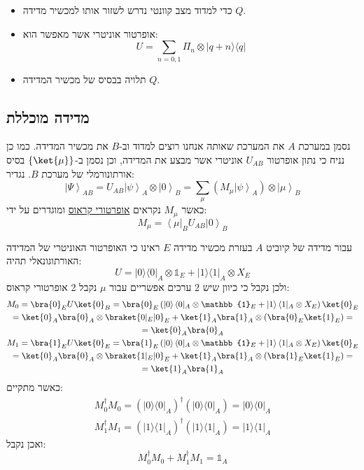 \documentclass{tstextbook}
\begin{document}
\begin{summary}
  \begin{itemize}
    \item כדי למדוד מצב קוונטי נדרש לשזור אותו למכשיר מדידה \(Q\).
    \item אופרטור אוניטרי אשר מאפשר הוא:
$$U=\sum_{n=0,1}\Pi_{n}\otimes|q+n\rangle\langle q|$$
    \item תלויה בבסיס של מכשיר המדידה \(Q\).
  \end{itemize}
\end{summary}
\subsection{מדידה מוכללת}

\begin{definition}
נסמן במערכת \(A\) את המערכת שאותה אנחנו רוצים למדוד וב-\(B\) את מכשיר המדידה. כמו כן נניח כי נתון אופרטור \(U_{AB}\) אוניטרי אשר מבצע את המדידה, וכן נסמן ב-\(\left\{  \ket{\mu}  \right\}\) בסיס אורתונורמלי של מערכת \(B\). נגדיר:
$$\left|\Psi\right\rangle_{A B}=U_{A B}\left|\psi\right\rangle_{A}\otimes\left|0\right\rangle_{B}=\sum_{\mu}\left(M_{\mu}\left|\psi\right\rangle_{A}\right)\otimes\left|\mu\right\rangle_{B}$$
כאשר \(M_{\mu}\) נקראים \underline{אופרטורי קראוס} ומוגדרים על ידי:
$$M_{\mu}=\left\langle\mu\right|_{B}U_{A B}\left|0\right\rangle_{B}$$

\end{definition}
\begin{example}
עבור מדידה של קיוביט \(A\) בעזרת מכשיר מדידה \(E\) ראינו כי האופרטור האוניטרי של המדידה האורתוגונאלי תהיה:
$$U=|0\rangle\langle0|_{A}\otimes \mathbb{1}_{E}+|1\rangle\langle1|_{A}\otimes X_{E}$$
ולכן נקבל כי כיוון שיש 2 ערכים אפשריים עבור \(\mu\) נקבל 2 אופרטורי קראוס:
$$\begin{gather}M_{0}=\bra{0} _{E}U\ket{0} _{B}=\bra{0}_{E} \left( |0\rangle\left\langle 0|_{A}\otimes \mathbb{1}_{E}+|1 \right\rangle\langle1|_{A}\otimes X_{E} \right)\ket{0} _{E} \\=\ket{0} _{A}\bra{0} _{A}\otimes \braket{ 0 | _{E}|0 }   _{E}+\ket{1} _{A}\bra{1} _{A}\otimes \left( \bra{0} _{E}\ket{1} _{E}  \right)= \\=\ket{0} _{A}\bra{0} _{A} \\M_{1}=\bra{1} _{E}U\ket{0} _{E}=\bra{1}_{E} \left( |0\rangle\left\langle 0|_{A}\otimes \mathbb{1}_{E}+|1 \right\rangle\langle1|_{A}\otimes X_{E} \right)\ket{0} _{E} \\=\ket{0} _{A}\bra{0} _{A}\otimes \braket{ 1 | _{E}|0 }   _{E}+\ket{1} _{A}\bra{1} _{A}\otimes \left( \bra{1} _{E}\ket{1} _{E}  \right)= \\=\ket{1} _{A}\bra{1} _{A}
\end{gather}$$
כאשר מתקיים:
$$\begin{gather}M_{0}^{\dagger}M_{0}=(|0\rangle\langle0|_{A})^{\dagger}(|0\rangle\langle0|_{A})=|0\rangle\langle0|_{A}\\ M_{1}^{\dagger}M_{1}=(|1\rangle\langle1|_{A})^{\dagger}(|1\rangle\langle1|_{A})=|1\rangle\langle1|_{A} 
\end{gather}$$
ואכן נקבל:
$$M_{0}^{\dagger}M_{0}+M_{1}^{\dagger}M_{1}=\mathbb{1} _{A}$$

\end{example}
\end{document}
